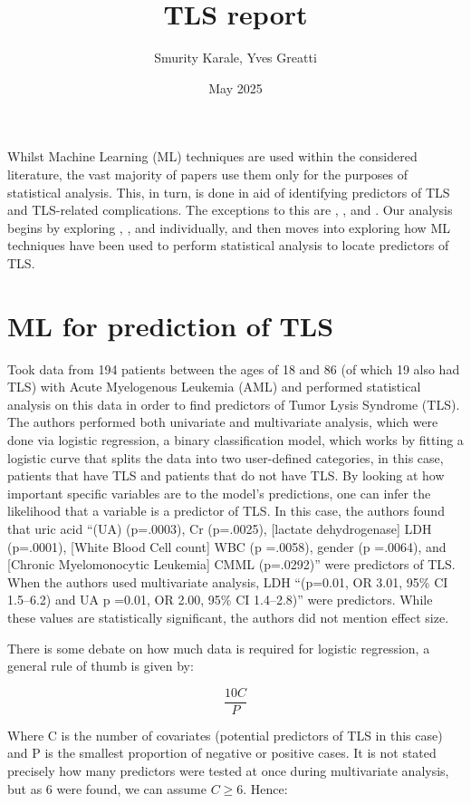 \documentclass{article}
\title{TLS report}
\author{Smurity Karale, Yves Greatti}
\date{May 2025}
\begin{document}
\maketitle

Whilst Machine Learning (ML) techniques are used within the considered literature, the vast majority of papers use them only for the purposes of statistical analysis. This, in turn, is done in aid of identifying predictors of TLS and TLS-related complications. The exceptions to this are \cite{mato2004predictive}, 
\cite{montesinos2008tumor}, and  \cite{xiao2024prediction}. Our analysis begins by exploring \cite{mato2004predictive}, 
\cite{montesinos2008tumor}, and  \cite{xiao2024prediction} individually, and then moves into exploring how ML techniques have been used to perform statistical analysis to locate predictors of TLS.

\section{ML for prediction of TLS}

\cite{mato2004predictive} Took data from 194 patients between the ages of 18 and 86 (of which 19 also had TLS) with Acute Myelogenous Leukemia (AML) and performed statistical analysis on this data in order to find predictors of Tumor Lysis Syndrome (TLS). The authors performed both univariate and multivariate analysis, which were done via logistic regression, a binary classification model, which works by fitting a logistic curve that splits the data into two user-defined categories, in this case, patients that have TLS and patients that do not have TLS. By looking at how important specific variables are to the model’s predictions, one can infer the likelihood that a variable is a predictor of TLS. In this case, the authors found that uric acid “(UA) (p=.0003), Cr (p=.0025), [lactate dehydrogenase] LDH (p=.0001), [White Blood Cell count] WBC (p =.0058), gender (p =.0064), and [Chronic Myelomonocytic Leukemia] CMML (p=.0292)” were predictors of TLS. When the authors used multivariate analysis, LDH “(p=0.01, OR 3.01, 95\% CI 1.5–6.2) and UA p =0.01, OR 2.00, 95\% CI 1.4–2.8)” were predictors. While these values are statistically significant, the authors did not mention effect size.

There is some debate on how much data is required for logistic regression, a general rule of thumb is given by:

\[\frac{10C}{P}\]

Where C is the number of covariates (potential predictors of TLS in this case) and P is the smallest proportion of negative or positive cases. It is not stated precisely how many predictors were tested at once during multivariate analysis, but as 6 were found, we can assume \(C \geq 6\). Hence:
\end{document}
